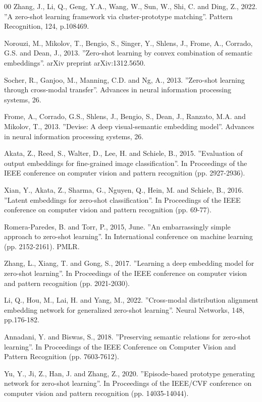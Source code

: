\documentclass{article}
\begin{document}
\begin{thebibliography}{00}
 Zhang, J., Li, Q., Geng, Y.A., Wang, W., Sun, W., Shi, C. and Ding, Z., 2022. ''A zero-shot learning framework via cluster-prototype matching''. Pattern Recognition, 124, p.108469.

 Norouzi, M., Mikolov, T., Bengio, S., Singer, Y., Shlens, J., Frome, A., Corrado, G.S. and Dean, J., 2013. ''Zero-shot learning by convex combination of semantic embeddings''. arXiv preprint arXiv:1312.5650.

 Socher, R., Ganjoo, M., Manning, C.D. and Ng, A., 2013. ''Zero-shot learning through cross-modal transfer''. Advances in neural information processing systems, 26.

 Frome, A., Corrado, G.S., Shlens, J., Bengio, S., Dean, J., Ranzato, M.A. and Mikolov, T., 2013. ''Devise: A deep visual-semantic embedding model''. Advances in neural information processing systems, 26.

 Akata, Z., Reed, S., Walter, D., Lee, H. and Schiele, B., 2015. ''Evaluation of output embeddings for fine-grained image classification''. In Proceedings of the IEEE conference on computer vision and pattern recognition (pp. 2927-2936).

 Xian, Y., Akata, Z., Sharma, G., Nguyen, Q., Hein, M. and Schiele, B., 2016. ''Latent embeddings for zero-shot classification''. In Proceedings of the IEEE conference on computer vision and pattern recognition (pp. 69-77).

 Romera-Paredes, B. and Torr, P., 2015, June. ''An embarrassingly simple approach to zero-shot learning''. In International conference on machine learning (pp. 2152-2161). PMLR.

 Zhang, L., Xiang, T. and Gong, S., 2017. ''Learning a deep embedding model for zero-shot learning''. In Proceedings of the IEEE conference on computer vision and pattern recognition (pp. 2021-2030).

 Li, Q., Hou, M., Lai, H. and Yang, M., 2022. ''Cross-modal distribution alignment embedding network for generalized zero-shot learning''. Neural Networks, 148, pp.176-182.

 Annadani, Y. and Biswas, S., 2018. ''Preserving semantic relations for zero-shot learning''. In Proceedings of the IEEE Conference on Computer Vision and Pattern Recognition (pp. 7603-7612).

 Yu, Y., Ji, Z., Han, J. and Zhang, Z., 2020. ''Episode-based prototype generating network for zero-shot learning''. In Proceedings of the IEEE/CVF conference on computer vision and pattern recognition (pp. 14035-14044).


\end{thebibliography}
\end{document}
